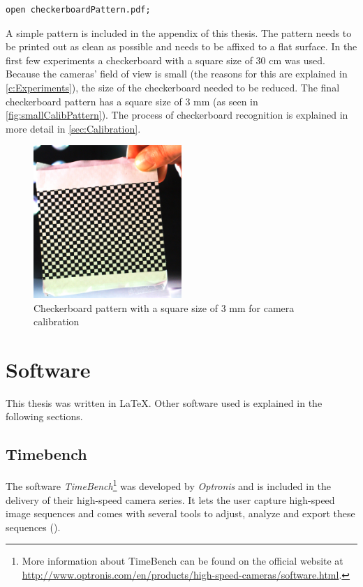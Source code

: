 \begin{lstlisting}
open checkerboardPattern.pdf;
\end{lstlisting}

A simple pattern is included in the appendix of this thesis. The pattern needs to be printed out as clean as possible and needs to be affixed to a flat surface. In the first few experiments a checkerboard with a square size of 30 cm was used. Because the cameras' field of view is small (the reasons for this are explained in \autoref{c:Experiments}), the size of the checkerboard needed to be reduced. The final checkerboard pattern has a square size of 3 mm (as seen in \autoref{fig:smallCalibPattern}). The process of checkerboard recognition is explained in more detail in \autoref{sec:Calibration}.  

\begin{figure}[htbp]
		\centering
		\includegraphics[width=0.5\textwidth]{figures/smallCalibPattern}
		\caption[Checkerboard pattern for camera calibration]{Checkerboard pattern with a square size of 3 mm for camera calibration}
		\label{fig:smallCalibPattern}
\end{figure}

\section{Software} \label{sec:Software}
This thesis was written in \LaTeX . Other software used is explained in the following sections.

\subsection{Timebench} \label{ssec:Timebench}
The software \textit{TimeBench}\footnote{More information about TimeBench can be found on the official website at \url{http://www.optronis.com/en/products/high-speed-cameras/software.html}.} was developed by \textit{Optronis} and is included in the delivery of their high-speed camera series. It lets the user capture high-speed image sequences and comes with several tools to adjust, analyze and export these sequences (\cite{Optronis.2016}). 

